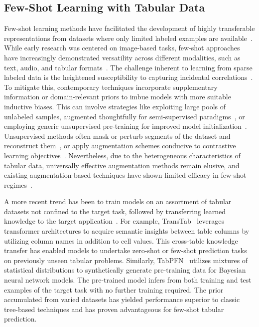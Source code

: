 \subsection{Few-Shot Learning with Tabular Data} Few-shot learning methods have facilitated the development of highly transferable representations from datasets where only limited labeled examples are available~\cite{chen2018closer}. While early research was centered on image-based tasks, few-shot approaches have increasingly demonstrated versatility across different modalities, such as text, audio, and tabular formats~\cite{majumder2022few,nam2023stunt,schick2021exploiting}. The challenge inherent to learning from sparse labeled data is the heightened susceptibility to capturing incidental correlations~\cite{bartlett2021deep}. To mitigate this, contemporary techniques incorporate supplementary information or domain-relevant priors to imbue models with more suitable inductive biases. This can involve strategies like exploiting large pools of unlabeled samples, augmented thoughtfully for semi-supervised paradigms~\cite{ucar2021subtab,yoon2020vime}, or employing generic unsupervised pre-training for improved model initialization~\cite{somepalli2021saint}. Unsupervised methods often mask or perturb segments of the dataset and reconstruct them~\cite{arik2021tabnet,majmundar2022met}, or apply augmentation schemes conducive to contrastive learning objectives~\cite{bahri2022scarf,chen2020simple}. Nevertheless, due to the heterogeneous characteristics of tabular data, universally effective augmentation methods remain elusive, and existing augmentation-based techniques have shown limited efficacy in few-shot regimes~\cite{nam2023stunt}.

A more recent trend has been to train models on an assortment of tabular datasets not confined to the target task, followed by transferring learned knowledge to the target application~\cite{zhang2023generative,levin2022transfer,zhu2023xtab}. For example, TransTab~\cite{wang2022transtab} leverages transformer architectures to acquire semantic insights between table columns by utilizing column names in addition to cell values. This cross-table knowledge transfer has enabled models to undertake zero-shot or few-shot prediction tasks on previously unseen tabular problems. Similarly, TabPFN~\cite{hollmann2022tabpfn} utilizes mixtures of statistical distributions to synthetically generate pre-training data for Bayesian neural network models. The pre-trained model infers from both training and test examples of the target task with no further training required. The prior accumulated from varied datasets has yielded performance superior to classic tree-based techniques and has proven advantageous for few-shot tabular prediction.

